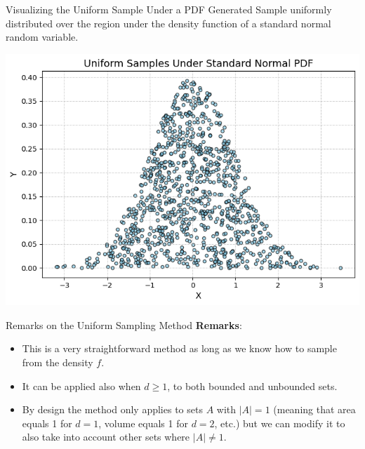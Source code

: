 \documentclass[8pt]{beamer}
\begin{document}
\begin{frame}{Visualizing the Uniform Sample Under a PDF}
Generated Sample uniformly distributed over the region under the density function of a standard normal random variable.

\begin{center}
\includegraphics[scale=0.5]{chapter1-part5-plot1.png}
\end{center}
\end{frame}


\begin{frame}{Remarks on the Uniform Sampling Method}
\textbf{Remarks}:

\begin{itemize}
	\item This is a very straightforward method as long as we know how to sample from the density $f$.
	\item It can be applied also when $d \geq 1$, to both bounded and unbounded sets.
	\item By design the method only applies to sets $A$ with $|A|=1$ (meaning that area equals 1 for $d=1$, volume equals 1 for $d=2$, etc.) but we can modify it to also take into account other sets where $|A| \neq 1$.
\end{itemize}
\end{frame}
\end{document}
